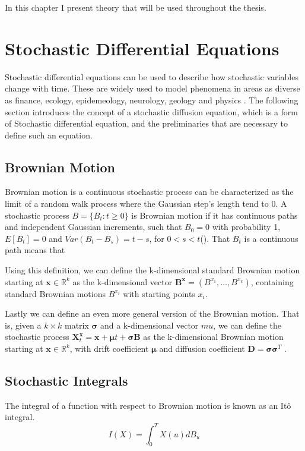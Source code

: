 In this chapter I present theory that will be used throughout the thesis.



\section{Stochastic Differential Equations}
Stochastic differential equations can be used to describe how stochastic variables change with time. These are widely used to model phenomena in areas as diverse as finance, ecology, epidemeology, neurology, geology and physics \cite{iacus_simulation_2008}. The following section introduces the concept of a stochastic diffusion equation, which is a form of Stochastic differential equation, and the preliminaries that are necessary to define such an equation.


\subsection{Brownian Motion}
Brownian motion is a continuous stochastic process can be characterized as the limit of a random walk process where the Gaussian step's length tend to 0. A stochastic process $B = \{B_t:t\geq 0\}$ is Brownian motion if it has continuous paths and independent Gaussian increments, such that $B_0 = 0$ with probability 1, $E[B_t] = 0$ and $Var(B_t - B_s) = t-s$, for $0 < s < t$(\cite{iacus_simulation_2008}).  That $B_t$ is a continuous path means that

Using this definition, we can define the k-dimensional standard Brownian motion starting at $\textbf{x} \in \mathbb{R}^k$ as the k-dimensional vector $\mathbf{B}^\mathbf{x} = (B^{x_1}, \dots , B^{x_k})$, containing standard Brownian motions $B^{x_i}$ with starting points $x_i$\cite{bhattacharya_continuous_2023}.

Lastly we can define an even more general version of the Brownian motion. That is, given a $k \times k$ matrix $\pmb{\sigma}$ and a k-dimensional vector $mu$, we can define the stochastic process $\mathbf{X}_t^\mathbf{x} = \mathbf{x} + \pmb{\mu}t + \pmb{\sigma} \mathbf{B}$ as the k-dimensional Brownian motion starting at $\mathbf{x} \in \mathbb{R}^k$, with drift coefficient $\pmb{\mu}$ and diffusion coefficient $\mathbf{D} = \pmb{\sigma} \pmb{\sigma}^T$ \cite{bhattacharya_continuous_2023}.

\subsection{Stochastic Integrals}
The integral of a function with respect to Brownian motion is known as an Itô integral. 
$$I(X) = \int_0^T X(u)dB_u$$

